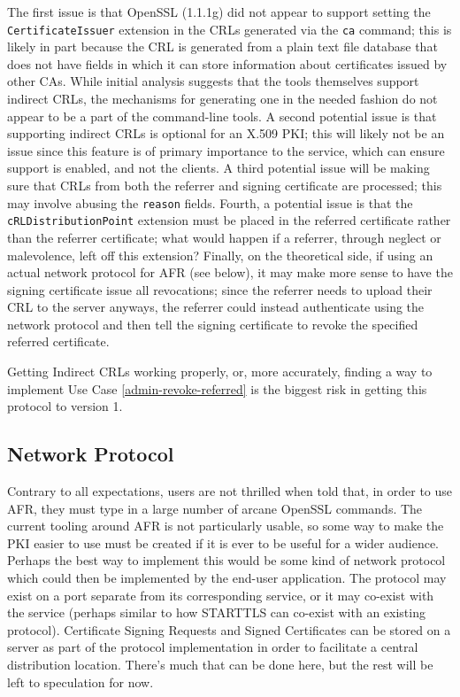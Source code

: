 \documentclass{article}
\begin{document}
The first issue is that OpenSSL (1.1.1g) did not appear to support setting the \texttt{CertificateIssuer} extension in the CRLs generated via the \texttt{ca} command; this is likely in part because the CRL is generated from a plain text file database that does not have fields in which it can store information about certificates issued by other CAs.  While initial analysis suggests that the tools themselves support indirect CRLs, the mechanisms for generating one in the needed fashion do not appear to be a part of the command-line tools.  A second potential issue is that supporting indirect CRLs is optional for an X.509 PKI; this will likely not be an issue since this feature is of primary importance to the service, which can ensure support is enabled, and not the clients.  A third potential issue will be making sure that CRLs from both the referrer and signing certificate are processed; this may involve abusing the \texttt{reason} fields.  Fourth, a potential issue is that the \texttt{cRLDistributionPoint} extension must be placed in the referred certificate rather than the referrer certificate; what would happen if a referrer, through neglect or malevolence, left off this extension?  Finally, on the theoretical side, if using an actual network protocol for AFR (see below), it may make more sense to have the signing certificate issue all revocations; since the referrer needs to upload their CRL to the server anyways, the referrer could instead authenticate using the network protocol and then tell the signing certificate to revoke the specified referred certificate.

Getting Indirect CRLs working properly, or, more accurately, finding a way to implement Use Case \ref{admin-revoke-referred} is the biggest risk in getting this protocol to version 1.

\subsection{Network Protocol}

Contrary to all expectations, users are not thrilled when told that, in order to use AFR, they must type in a large number of arcane OpenSSL commands.  The current tooling around AFR is not particularly usable, so some way to make the PKI easier to use must be created if it is ever to be useful for a wider audience.  Perhaps the best way to implement this would be some kind of network protocol which could then be implemented by the end-user application.  The protocol may exist on a port separate from its corresponding service, or it may co-exist with the service (perhaps similar to how STARTTLS can co-exist with an existing protocol).  Certificate Signing Requests and Signed Certificates can be stored on a server as part of the protocol implementation in order to facilitate a central distribution location.  There's much that can be done here, but the rest will be left to speculation for now.
\end{document}
